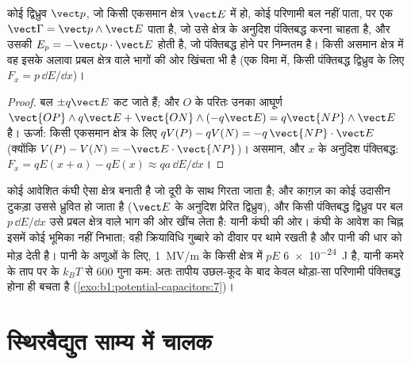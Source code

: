 \begin{proposition}[किसी बाह्य क्षेत्र में द्विध्रुव]\label{prop:b1:potential-capacitors:dipoleinfield}
कोई द्विध्रुव $\vect p$, जो किसी एकसमान क्षेत्र $\vect E$ में हो, कोई
परिणामी बल नहीं पाता, पर एक  $\vect\Gamma = \vect p\wedge\vect E$ पाता है, जो
उसे क्षेत्र के अनुदिश पंक्तिबद्ध करना चाहता है, और उसकी 
$E_p = -\vect p\cdot\vect E$ होती है, जो पंक्तिबद्ध होने पर निम्नतम है।
किसी असमान क्षेत्र में वह इसके अलावा प्रबल क्षेत्र वाले भागों की ओर खिंचता
भी है (एक विमा में, किसी पंक्तिबद्ध द्विध्रुव के लिए $F_x = p\,\dd E/\dd x$)।
\end{proposition}

\begin{proof}
बल $\pm q\vect E$ कट जाते हैं; और $O$ के परितः उनका आघूर्ण $\vect{OP}\wedge
q\vect E + \vect{ON}\wedge(-q\vect E) = q\vect{NP}\wedge\vect E$ है। ऊर्जा:
किसी एकसमान क्षेत्र के लिए $qV(P) - qV(N) = -q\,\vect{NP}\cdot\vect E$ (क्योंकि $V(P)
- V(N) = -\vect E\cdot\vect{NP}$)। असमान, और $x$ के अनुदिश पंक्तिबद्ध: $F_x =
qE(x + a) - qE(x) \approx qa\,\dd E/\dd x$।
\end{proof}

\begin{example}[कंघी काग़ज़ को क्यों खींचती है]\label{ex:b1:potential-capacitors:comb}
कोई आवेशित कंघी ऐसा क्षेत्र बनाती है जो दूरी के साथ गिरता जाता है; और
काग़ज़ का कोई उदासीन टुकड़ा उससे ध्रुवित हो जाता है ($\vect E$ के अनुदिश
प्रेरित द्विध्रुव), और किसी पंक्तिबद्ध द्विध्रुव पर बल $p\,\dd E/\dd x$ उसे
प्रबल क्षेत्र वाले भाग की ओर खींच लेता है: यानी कंघी की ओर। कंघी के आवेश का
चिह्न इसमें कोई भूमिका नहीं निभाता; वही क्रियाविधि गुब्बारे को दीवार पर
थामे रखती है और पानी की धार को मोड़ देती है। पानी के अणुओं के लिए,
\qty{1}{MV/m} के किसी क्षेत्र में $pE$
\qty{6e-24}{J} है, यानी कमरे के ताप पर के $k_BT$ से $600$ गुना कम:
अतः तापीय उछल-कूद के बाद केवल थोड़ा-सा परिणामी पंक्तिबद्ध होना ही बचता है
(\cref{exo:b1:potential-capacitors:7})।
\end{example}

\section{स्थिरवैद्युत साम्य में चालक}

